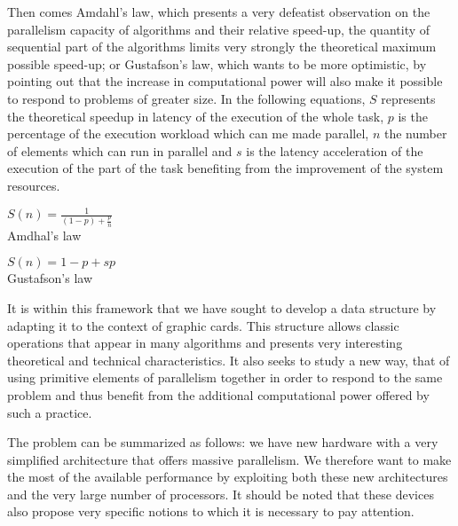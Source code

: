 Then comes Amdahl's law, which presents a very defeatist observation on the parallelism capacity of algorithms and their relative speed-up, the quantity of sequential part of the algorithms limits very strongly the theoretical maximum possible speed-up; or Gustafson's law, which wants to be more optimistic, by pointing out that the increase in computational power will also make it possible to respond to problems of greater size. In the following equations, $S$ represents the theoretical speedup in latency of the execution of the whole task, $p$ is the percentage of the execution workload which can me made parallel, $n$ the number of elements which can run in parallel and $s$ is the latency acceleration of the execution of the part of the task benefiting from the improvement of the system resources.

\vspace{15pt}

  \begin{minipage}[b]{0.35\linewidth}\centering
    $ S(n) = \frac{1}{(1 - p) + \frac{p}{n}} $ \\
    \vspace{15pt}
    Amdhal's law \\
  \end{minipage}\hfill
  \begin{minipage}[b]{0.55\linewidth}\centering
    $ S(n) = 1 - p + sp $ \\
    \vspace{15pt}
    Gustafson's law \\
  \end{minipage}
  
\vspace{15pt}

It is within this framework that we have sought to develop a data structure by adapting it to the context of graphic cards. This structure allows classic operations that appear in many algorithms and presents very interesting theoretical and technical characteristics. It also seeks to study a new way, that of using primitive elements of parallelism together in order to respond to the same problem and thus benefit from the additional computational power offered by such a practice.

The problem can be summarized as follows: we have new hardware with a very simplified architecture that offers massive parallelism. We therefore want to make the most of the available performance by exploiting both these new architectures and the very large number of processors. It should be noted that these devices also propose very specific notions to which it is necessary to pay attention.





